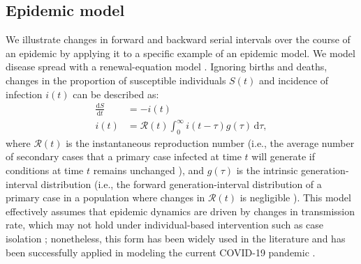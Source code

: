 \documentclass[12pt]{article}
\newcommand{\RR}{\ensuremath{{\mathcal R}}\xspace}
\newcommand{\dd}[1]{\ensuremath{\, \mathrm{d}#1}}
\newcommand{\dtau}{\dd{\tau}}
\newcommand{\gdist}{g} %
\begin{document}
\subsection{Epidemic model}

We illustrate changes in forward and backward serial intervals over the course of an epidemic by applying it to a specific example of an epidemic model.
We model disease spread with a renewal-equation model \citep{heesterbeek1996concept, diekmann2000mathematical, roberts2004modelling, aldis2005integral, roberts2007model, champredon2018equivalence}.
Ignoring births and deaths, changes in the proportion of susceptible individuals $S(t)$ and incidence of infection $i(t)$ can be described as:
\begin{align}
\frac{\mathrm{d}S}{\mathrm{d}t} &= - i(t)\nonumber\\
i(t) &= \RR(t) \int_0^\infty i(t-\tau) \gdist(\tau) \dtau,
\label{eq:renewal}
\end{align}
where $\RR(t)$ is the instantaneous reproduction number (i.e., the average number of secondary cases that a primary case infected at time $t$ will generate if conditions at time $t$ remains unchanged \citep{fraser2007estimating}), and $\gdist(\tau)$ is the intrinsic generation-interval distribution (i.e., the forward generation-interval distribution of a primary case in a population where changes in $\RR(t)$ is negligible \citep{champredon2015intrinsic}).
This model effectively assumes that epidemic dynamics are driven by changes in transmission rate, which may not hold under individual-based intervention such as case isolation \citep{fraser2007estimating};
nonetheless, this form has been widely used in the literature and has been successfully applied in modeling the current COVID-19 pandemic \citep{gostic2020practical}.
\end{document}
